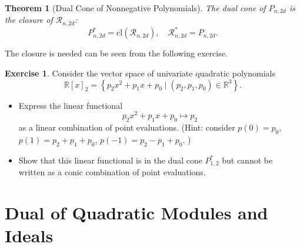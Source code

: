 \documentclass[
]{book}
\newtheorem{theorem}{Theorem}[chapter]
\theoremstyle{definition}
\theoremstyle{definition}
\theoremstyle{definition}
\newtheorem{exercise}{Exercise}[chapter]
\theoremstyle{definition}
\theoremstyle{remark}
\begin{document}
\begin{theorem}[Dual Cone of Nonnegative Polynomials]
\protect\hypertarget{thm:DualConeNonnegative}{}\label{thm:DualConeNonnegative}The dual cone of \(P_{n,2d}\) is the closure of \(\mathcal{R}_{n,2d}\):
\[
P_{n,2d}^* = \mathrm{cl}(\mathcal{R}_{n,2d}), \quad \mathcal{R}_{n,2d}^* = P_{n,2d}.
\]
\end{theorem}

The closure is needed can be seen from the following exercise.

\begin{exercise}

Consider the vector space of univariate quadratic polynomials
\[
\mathbb{R}[x]_2 =  \left\{ p_2 x^2 + p_1 x + p_0 \mid (p_2,p_1,p_0) \in \mathbb{R}^{3} \right\} .
\]

\begin{itemize}
\item
  Express the linear functional
  \[
  p_2 x^2 + p_1 x + p_0 \mapsto p_2
  \]
  as a linear combination of point evaluations. (Hint: consider \(p(0) = p_0\), \(p(1)=p_2 + p_1 + p_0\), \(p(-1) = p_2 - p_1 + p_0\). )
\item
  Show that this linear functional is in the dual cone \(P^*_{1,2}\) but cannot be written as a conic combination of point evaluations.
\end{itemize}

\end{exercise}

\section{Dual of Quadratic Modules and Ideals}\label{dual-of-quadratic-modules-and-ideals}
\end{document}
